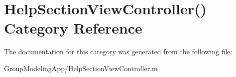 \hypertarget{category_help_section_view_controller_07_08}{\section{Help\-Section\-View\-Controller() Category Reference}
\label{category_help_section_view_controller_07_08}
}


The documentation for this category was generated from the following file\-:\begin{DoxyCompactItemize}
\item 
Group\-Modeling\-App/Help\-Section\-View\-Controller.\-m\end{DoxyCompactItemize}
